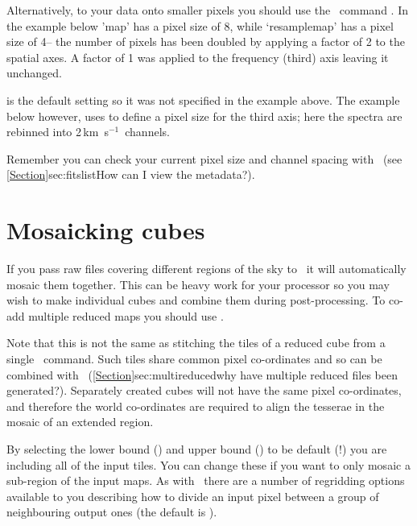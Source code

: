 \documentclass[11pt,oneside,chapters]{starlink}
\providecommand{\sqorst}{\xref{\task{sqorst}}{sun95}{SQORST}}
\newcommand{\kms}{\mbox{$\,$km~s$^{-1}$}}   %
\newcommand{\kms}{\,km~s$^{-1}$}   %
\begin{document}
Alternatively, to  your data onto smaller
pixels you should
use the \Kappa\ command \sqorst. In the example below 'map' has a
pixel size of 8\arcsec, while `resamplemap' has a pixel size of 4\arcsec --
the number of pixels has been doubled by applying a factor of 2 to the
spatial axes. A factor of 1 was applied to the frequency (third) axis
leaving it unchanged.
\begin{terminalv}
\end{terminalv}
 is the default setting so it was not specified in
the example above. The example below however, uses
 to define a pixel size for the third axis;
here the spectra are rebinned into 2\kms\ channels.
\begin{terminalv}
\end{terminalv}

Remember you can check your current pixel size and channel spacing
with \ndftrace\ (see \cref{Section}{sec:fitslist}{How can I view the
metadata?}).

\section{Mosaicking cubes}
\label{sec:mosaic}

If you pass raw files covering different regions of the sky to
\makecube\ it will automatically mosaic them together. This can be
heavy work for your processor so you may wish to make individual cubes
and combine them during post-processing. To co-add multiple reduced
maps you should use \wcsmosaic.

Note that this is not the same as stitching the tiles of a reduced cube
from a single \makecube\ command.  Such tiles share common pixel
co-ordinates and so can be combined with \paste\
(\cref{Section}{sec:multireduced}{why have multiple reduced files been
generated?}). Separately created
cubes will not have the same pixel co-ordinates, and therefore the
world co-ordinates are required to align the tesserae in the mosaic of
an extended region.

\begin{terminalv}
\end{terminalv}
By selecting the lower bound () and upper bound
() to be default (!) you are including all of the input
tiles. You can change these if you want to only mosaic a sub-region of
the input maps. As with \makecube\ there are a number of regridding
options available to you describing how to divide an input pixel
between a group of neighbouring output ones (the default is
).
\end{document}
